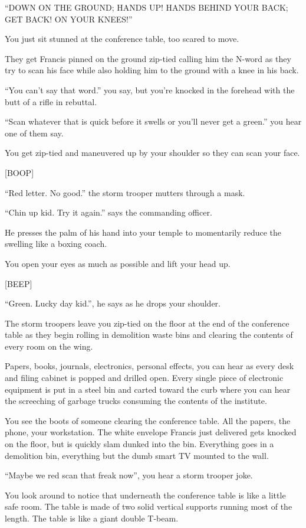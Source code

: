 \documentclass[17pt, twoside, a5paper, openright, extrafontsizes]{memoir}
\begin{document}
``DOWN ON THE GROUND; HANDS UP! HANDS BEHIND YOUR BACK; GET BACK! ON
YOUR KNEES!''

You just sit stunned at the conference table, too scared to move.

They get Francis pinned on the ground zip-tied calling him the N-word as
they try to scan his face while also holding him to the ground with a
knee in his back.

``You can't say that word.'' you say, but you're knocked in the forehead
with the butt of a rifle in rebuttal.

``Scan whatever that is quick before it swells or you'll never get a
green.'' you hear one of them say.

You get zip-tied and maneuvered up by your shoulder so they can scan
your face.

{[}BOOP{]}

``Red letter. No good.'' the storm trooper mutters through a mask.

``Chin up kid. Try it again.'' says the commanding officer.

He presses the palm of his hand into your temple to momentarily reduce
the swelling like a boxing coach.

You open your eyes as much as possible and lift your head up.

{[}BEEP{]}

``Green. Lucky day kid.'', he says as he drops your shoulder.

The storm troopers leave you zip-tied on the floor at the end of the
conference table as they begin rolling in demolition waste bins and
clearing the contents of every room on the wing.

Papers, books, journals, electronics, personal effects, you can hear as
every desk and filing cabinet is popped and drilled open. Every single
piece of electronic equipment is put in a steel bin and carted toward
the curb where you can hear the screeching of garbage trucks consuming
the contents of the institute.

You see the boots of someone clearing the conference table. All the
papers, the phone, your workstation. The white envelope Francis just
delivered gets knocked on the floor, but is quickly slam dunked into the
bin. Everything goes in a demolition bin, everything but the dumb smart
TV mounted to the wall.

``Maybe we red scan that freak now'', you hear a storm trooper joke.

You look around to notice that underneath the conference table is like a
little safe room. The table is made of two solid vertical supports
running most of the length. The table is like a giant double T-beam.
\end{document}
